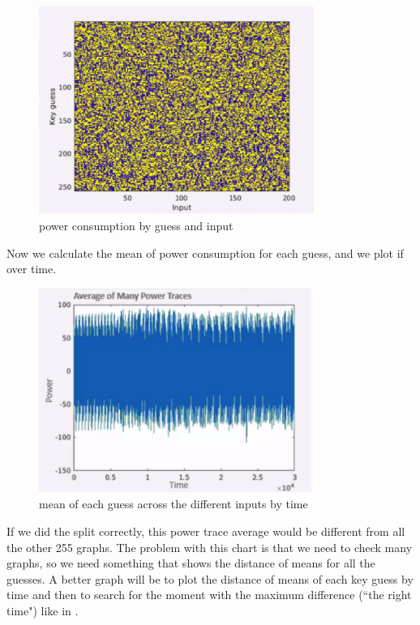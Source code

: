 \begin{figure}[!ht]
    \centering
    \includegraphics[width=0.8\textwidth]{images/Lecture6/intensity_by_guess.png}
    \caption{power consumption by guess and input} \label{fig:intensity_by_guess}
\end{figure}

Now we calculate the mean of power consumption for each guess, and we plot if over time.

\begin{figure}[!ht]
    \centering
    \includegraphics[width=0.8\textwidth]{images/Lecture6/avg_of_many_traces.png}
    \caption{mean of each guess across the different inputs by time} \label{fig:avg_of_many_traces}
\end{figure}


If we did the split correctly, this power trace average would be different from all the other 255 graphs. 
The problem with this chart is that we need to check many graphs, so we need something that shows the distance of means for all the guesses. 
A better graph will be to plot the distance of means of each key guess by time and then to search for the moment with the maximum difference (``the right time") like in .

